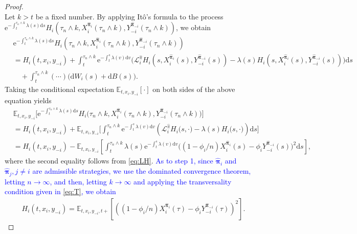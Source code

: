 \documentclass[11pt]{article}
\newcommand \drm {\mathrm{d}}
\newcommand \e {\mathrm{e}}
\numberwithin{equation}{section}
\newcommand{\blue}[1]{\textcolor{blue}{#1}}
\newcommand{\bpi}{\boldsymbol{\pi}}
\providecommand{\smn}{{-}} %
\begin{document}
\begin{proof}
\[	\]
	Let \(k>t\) be a fixed number. By applying It\^{o}'s formula to the process \(\e^{-\int_t^{\tau_n\wedge k}\lambda(s)\drm s} H_i(\tau_n\wedge k,X_i^{\widehat{\bm{\pi}}_i}(\tau_n\wedge k),Y^{\widehat{\bpi}_{\smn i}}_{\smn i}(\tau_n\wedge k))\), we obtain
	\begin{align*}
		&\e^{-\int_t^{\tau_n\wedge k}\lambda(s)\drm s} H_i(\tau_n\wedge k,X_i^{\widehat{\bm{\pi}}_i}(\tau_n\wedge k),Y^{\widehat{\bpi}_{\smn i}}_{\smn i}(\tau_n\wedge k))\\
		&=H_i(t,x_i,y_{\smn i})+\int_t^{\tau_n\wedge k} \e^{-\int_t^s \lambda(v)\drm v}\Big(\mathcal{L}_i^{\widehat{\pi}}H_i(s,X_i^{\widehat{\bm{\pi}}_i}(s),Y^{\widehat{\bpi}_{\smn i}}_{\smn i}(s))-\lambda(s)H_i(s,X_i^{\widehat{\bm{\pi}}_i}(s),Y^{\widehat{\bpi}_{\smn i}}_{\smn i}(s))\Big)\drm s\\
		&\quad +\int_t^{\tau_n\wedge k}(\cdots)\big( \drm W_i(s) + \drm B(s)\big).
	\end{align*}
	Taking the conditional expectation \(\mathbb{E}_{t, x_i, y_{\smn i}}[\cdot]\) on both sides of the above equation yields
	\begin{align}
		&	\mathbb{E}_{t,x_i,y_{\smn i}}\Big[\e^{-\int_t^{\tau_n\wedge k}\lambda(s)\drm s} H_i\big(\tau_n\wedge k,X_i^{\widehat{\bm{\pi}}_i}(\tau_n \wedge k),Y^{\widehat{\bpi}_{\smn i}}_{\smn i}(\tau_n \wedge k)\big)\Big]\\
		&=H_i(t,x_i,y_{\smn i})+\mathbb{E}_{t,x_i,y_{\smn i}}\bigg[\int_t^{\tau_n\wedge k} \e^{-\int_t^s \lambda(v)\drm v}\left(\mathcal{L}_i^{\widehat{\pi}}H_i\big(s,\cdot\big)-\lambda(s)H_i\big(s,\cdot\big)\right)\drm s\bigg]\\
		&=H_i(t,x_i,y_{\smn i})-\mathbb{E}_{t,x_i,y_{\smn i}}\left[\int_t^{\tau_n\wedge k} \lambda(s)\e^{-\int_t^s \lambda(v)\drm v}\big((1-\phi_i/n)X^{\widehat{\bm{\pi}}_i}_i(s)-\phi_iY^{\widehat{\bpi}_{\smn i}}_{\smn i}(s)\big)^2\drm s\right],
	\end{align}
	where the second equality follows from \eqref{eq:LH}.
\blue{As to step 1, since $\widehat{\bm{\pi}}_i$ and $\widehat{\bm{\pi}}_j, j\neq i$ are admissible strategies, we use the dominated convergence theorem, letting \(n\to\infty\), and then, letting \(k \to \infty\) and applying the transversality condition given in \eqref{eq:T}, we obtain}
	\begin{align}
		H_i(t,x_i,y_{\smn i})=\mathbb{E}_{t,x_i,y_{\smn i},t+}\left[\left((1-\phi_i/n)X_i^{\widehat{\bm{\pi}}_i}(\tau)-\phi_i Y^{\widehat{\bpi}_{\smn i}}_{\smn i}(\tau)\right)^2\right].
	\end{align}


\end{proof}
\end{document}
